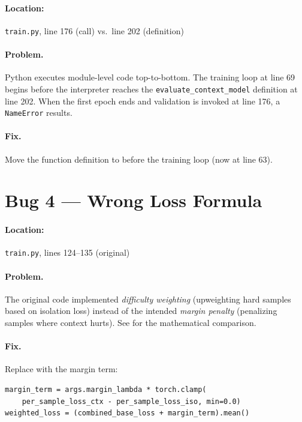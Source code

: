 \documentclass[11pt, a4paper]{report}
\begin{document}
\paragraph{Location:} \texttt{train.py}, line 176 (call) vs.\ line 202 (definition)

\paragraph{Problem.} Python executes module-level code top-to-bottom. The training loop at line 69 begins before the interpreter reaches the \texttt{evaluate\_context\_model} definition at line 202. When the first epoch ends and validation is invoked at line 176, a \texttt{NameError} results.

\paragraph{Fix.} Move the function definition to before the training loop (now at line 63).

\section{Bug 4 --- Wrong Loss Formula}
\label{sec:bug4}

\paragraph{Location:} \texttt{train.py}, lines 124--135 (original)

\paragraph{Problem.} The original code implemented \emph{difficulty weighting} (upweighting hard samples based on isolation loss) instead of the intended \emph{margin penalty} (penalizing samples where context hurts). See  for the mathematical comparison.

\paragraph{Fix.} Replace with the margin term:
\begin{lstlisting}[style=pythonstyle, frame=single, numbers=none]
margin_term = args.margin_lambda * torch.clamp(
    per_sample_loss_ctx - per_sample_loss_iso, min=0.0)
weighted_loss = (combined_base_loss + margin_term).mean()
\end{lstlisting}
\end{document}
